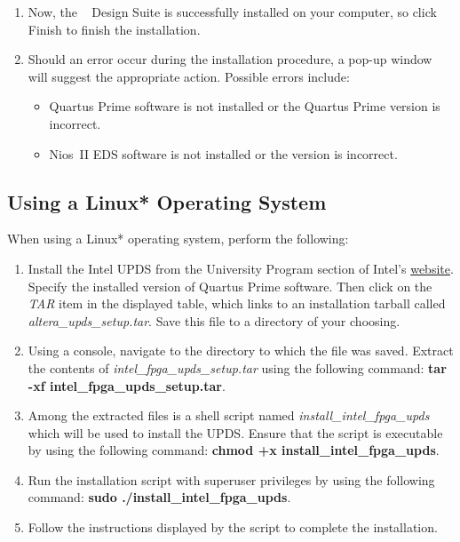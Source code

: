 \documentclass[11pt, twoside, pdftex]{article}
\begin{document}
\begin{enumerate}
\item Now, the \teamname~ Design Suite is successfully installed on your computer, so click {\sf Finish} to
finish the installation.

\item Should an error occur during the installation procedure, a pop-up window will suggest the appropriate action. 
Possible errors include:
\begin{itemize}
\item Quartus Prime software is not installed or the Quartus Prime version is incorrect.
\item Nios~II EDS software is not installed or the version is incorrect.
\end{itemize}
\end{enumerate}

\subsection{Using a Linux* Operating System}

When using a Linux* operating system, perform the following:

\begin{enumerate} 
\item Install the Intel UPDS from the University Program section of Intel's \href{https://www.intel.com/content/www/us/en/programmable/support/training/university/materials-software.html}{website}.
Specify the installed version of Quartus Prime software.
Then click on the {\it TAR} item in the displayed table, 
which links to an installation tarball called 
{\it altera\_upds\_setup.tar}. 
Save this file to a directory of your choosing.

\item Using a console, navigate to the directory to which the
file was saved. Extract the contents of 
{\it intel\_fpga\_upds\_setup.tar} using the following command: 
{\bf tar -xf intel\_fpga\_upds\_setup.tar}.

\item Among the extracted files is a shell script named
{\it install\_intel\_fpga\_upds} which will be used to install the
UPDS. Ensure that the script is executable by using the following
command: {\bf chmod +x install\_intel\_fpga\_upds}. 

\item Run the installation script with superuser privileges by
using the following command: 
{\bf sudo ./install\_intel\_fpga\_upds}.

\item Follow the instructions displayed by the script to complete
the installation.

\end{enumerate}
\end{document}
